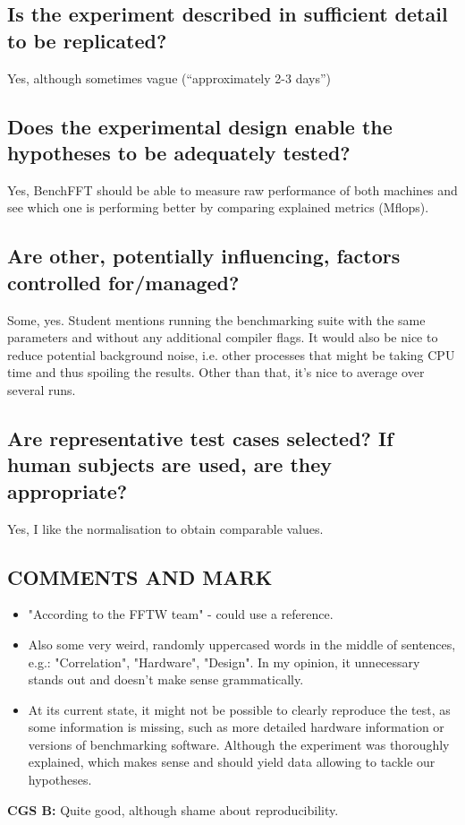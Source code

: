 \documentclass{article}
\begin{document}
\begin{normalsize}
\subsection{Is the experiment described in sufficient detail to be replicated?}
Yes, although sometimes vague (``approximately 2-3 days'')
\subsection{Does the experimental design enable the hypotheses to be adequately tested?}
Yes, BenchFFT should be able to measure raw performance of both machines and see which one is performing better by comparing explained metrics (Mflops).
\subsection{Are other, potentially influencing, factors controlled for/managed?}
Some, yes. Student mentions running the benchmarking suite with the same parameters and without any additional compiler flags. It would also be nice to reduce potential background noise, i.e. other processes that might be taking CPU time and thus spoiling the results.
\bigbreak\noindent
Other than that, it's nice to average over several runs.
\subsection{Are representative test cases selected?  If human subjects are used, are they appropriate?}
Yes, I like the normalisation to obtain comparable values. 
\subsection{COMMENTS AND MARK}
\begin{itemize}
\item "According to the FFTW team" - could use a reference.
\item Also some very weird, randomly uppercased words in the middle of sentences, e.g.: "Correlation", "Hardware", "Design". In my opinion, it unnecessary stands out and doesn't make sense grammatically.
\item At its current state, it might not be possible to clearly reproduce the test, as some information is missing, such as more detailed hardware information or versions of benchmarking software. Although the experiment was thoroughly explained, which makes sense and should yield data allowing to tackle our hypotheses.
\end{itemize}
\bigbreak\noindent
  \textbf{CGS B: }Quite good, although shame about reproducibility.

\end{normalsize}
\end{document}

